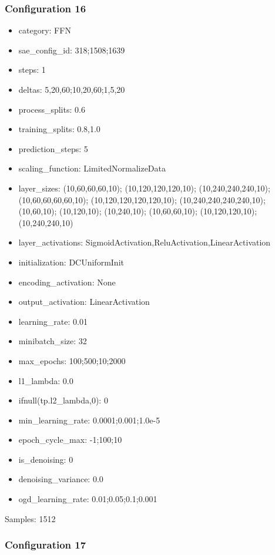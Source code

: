 \documentclass[a4paper,11pt,oneside]{article}
\theoremstyle{plain}
\theoremstyle{definition}
\begin{document}
	\subsubsection{Configuration 16}\label{config16}
	\begin{itemize}
		\item category: FFN
		\item sae\_config\_id: 318;1508;1639
		\item steps: 1
		\item deltas: 5,20,60;10,20,60;1,5,20
		\item process\_splits: 0.6
		\item training\_splits: 0.8,1.0
		\item prediction\_steps: 5
		\item scaling\_function: LimitedNormalizeData
		\item layer\_sizes: (10,60,60,60,10); (10,120,120,120,10); (10,240,240,240,10); (10,60,60,60,60,10); (10,120,120,120,120,10); (10,240,240,240,240,10); (10,60,10); (10,120,10); (10,240,10); (10,60,60,10); (10,120,120,10); (10,240,240,10)
		\item layer\_activations: SigmoidActivation,ReluActivation,LinearActivation
		\item initialization: DCUniformInit
		\item encoding\_activation: None
		\item output\_activation: LinearActivation
		\item learning\_rate: 0.01
		\item minibatch\_size: 32
		\item max\_epochs: 100;500;10;2000
		\item l1\_lambda: 0.0
		\item ifnull(tp.l2\_lambda,0): 0
		\item min\_learning\_rate: 0.0001;0.001;1.0e-5
		\item epoch\_cycle\_max: -1;100;10
		\item is\_denoising: 0
		\item denoising\_variance: 0.0
		\item ogd\_learning\_rate: 0.01;0.05;0.1;0.001
	\end{itemize}
	
	Samples: 1512
	
	\subsubsection{Configuration 17}\label{config17}
	
\end{document}
